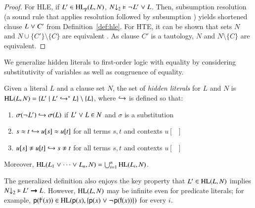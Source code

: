 \begin{proof}
For HLE, if $L' \in \PHL(L, N)$,  $\binset{N} \models \neglit{L'} \cor L$. Then,
subsumption resolution (a sound rule that applies resolution followed by
subsumption \cite{bg-01-resolution}) yields shortened clause $L \cor C'$ from
Definition~\ref{def:hle}. For HTE, it can be shown that sets $N$ and $N
\cup \{ C' \} \setminus \{C\}$ are equivalent
\cite[Sect.~2.1]{hjb-2011-big-simplification}. As clause $C'$ is a tautology,
$N$ and $N \setminus \{C\}$ are equivalent.\qedhere
\end{proof}

We generalize hidden literals to first-order logic with equality by
considering substitutivity of variables as well as congruence of equality.

\begin{defi}
\label{def:hl-fo}
Given a literal $L$ and a clause set $N$,
the set of \emph{hidden literals} for $L$ and $N$
is $\HL(L,N) = \{ L' \mid L' \bigfimpl{N}^\ast L \} \setminus \{ L \}$, where
$\bigfimpl{N}$ is defined so that:
\begin{enumerate}
    \item $\sigmaterm{\neglit{L'}} \bigfimpl{N} \sigmaterm{L}$ if
    $L' \cor L \in N$ and $\sigma$ is a substitution
    \item $\eqlit{s}{t} \bigfimpl{N} \eqlit{u[s]}{u[t]}$ for all terms $s, t$ and
    contexts $u[\phantom{\cdot}]$
    \item $\neqlit{u[s]}{u[t]} \bigfimpl{N} \neqlit{s}{t}$ for all terms $s, t$ and
    contexts $u[\phantom{\cdot}]$
\end{enumerate}
Moreover, $\HL(L_1 \cor \cdots \cor L_n, N) = \bigcup_{i=1}^n \HL(L_i, N)$.
\end{defi}

The generalized definition also enjoys the key property that $L'
\in \HL(L, N)$ implies $\binset{N} \models L' \impl L$. However, $\HL(L, N)$
may be infinite even for predicate literals; for example,
$\pospredlit{\cst{p}(\cst{f}^i(x))} \in \HL(\pospredlit{\cst{p}(x)}, \{\pospredlit{\cst{p}(x)} \cor
\negpredlit{\cst{p}(\cst{f}(x))} \})$ for every $i$.

